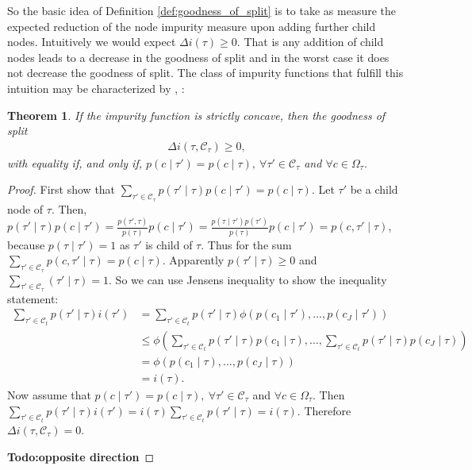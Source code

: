 \documentclass[12pt,a4paper]{article}
\newtheorem{theorem}{Theorem}
\begin{document}
So the basic idea of Definition \ref{def:goodness_of_split} is to take as measure the expected reduction of the node impurity measure upon adding further child nodes. Intuitively we would expect $\Delta i(\tau) \geq 0$. That is any addition of child nodes leads to a decrease in the goodness of split and in the worst case it does not  decrease the goodness of split. The class of impurity functions that fulfill this intuition may be characterized by \cite[Appendix of Chap. 4]{cart84}, \cite{Ripley1995}:
\begin{theorem} \label{thm:classification_impurity_functions}
	If the impurity function is strictly concave, then the goodness of split 
	\begin{align*}
	\Delta i(\tau, \mathcal C_\tau) \geq 0,
	\end{align*}
	with equality if, and only if, $p(c \mid \tau') =  p(c \mid \tau), ~ \forall \tau' \in \mathcal C_\tau$ and $\forall c \in \Omega_\tau$. 
\end{theorem}
\begin{proof}
	First show that $\sum_{\tau' \in \mathcal C_\tau} p(\tau' \mid \tau) p(c\mid\tau') =  p(c\mid\tau)$. Let $\tau'$ be a child node of $\tau$. Then, $p(\tau' \mid \tau) p(c\mid\tau') = \frac{p(\tau', \tau)}{p(\tau)}   p(c\mid\tau') = \frac{p(\tau \mid \tau') p(\tau')}{p(\tau)}   p(c\mid\tau') = p(c, \tau' \mid \tau)$, because $p(\tau \mid \tau') =1$ as $\tau'$ is child of $\tau$. Thus for the sum $\sum_{\tau' \in \mathcal C_\tau}  p(c, \tau' \mid \tau) =  p(c \mid \tau)$.  Apparently $p(\tau' \mid \tau) \geq 0$ and $\sum_{\tau' \in \mathcal C_\tau} (\tau' \mid \tau) = 1$. So we can use Jensens inequality to show the inequality statement:
	\begin{align*}\sum_{\tau' \in \mathcal C_t} p(\tau'\mid \tau) i(\tau') &= \sum_{\tau' \in \mathcal C_t} p(\tau'\mid \tau) \phi(p(c_1\mid \tau'),\dots, p(c_J\mid \tau')) \\
	& \leq \phi \left(\sum_{\tau' \in \mathcal C_t} p(\tau'\mid \tau)  p(c_1\mid\tau), \dots,  \sum_{\tau' \in \mathcal C_t} p(\tau'\mid \tau)  p(c_J\mid\tau)\right) \\
	& = \phi \left(p(c_1\mid\tau), \dots, p(c_J\mid\tau)\right)  \\
	& =  i(\tau).
	\end{align*}
	Now assume that $p(c \mid \tau') =  p(c \mid \tau), ~ \forall \tau' \in \mathcal C_\tau$ and $\forall c \in \Omega_\tau$. Then $\sum_{\tau' \in \mathcal C_t} p(\tau'\mid \tau) i(\tau') = i(\tau)\sum_{\tau' \in \mathcal C_t} p(\tau'\mid \tau) = i(\tau)$. Therefore $\Delta i(\tau, \mathcal C_\tau) = 0$. 
	
	\textbf{Todo:opposite direction}
\end{proof}
\end{document}
